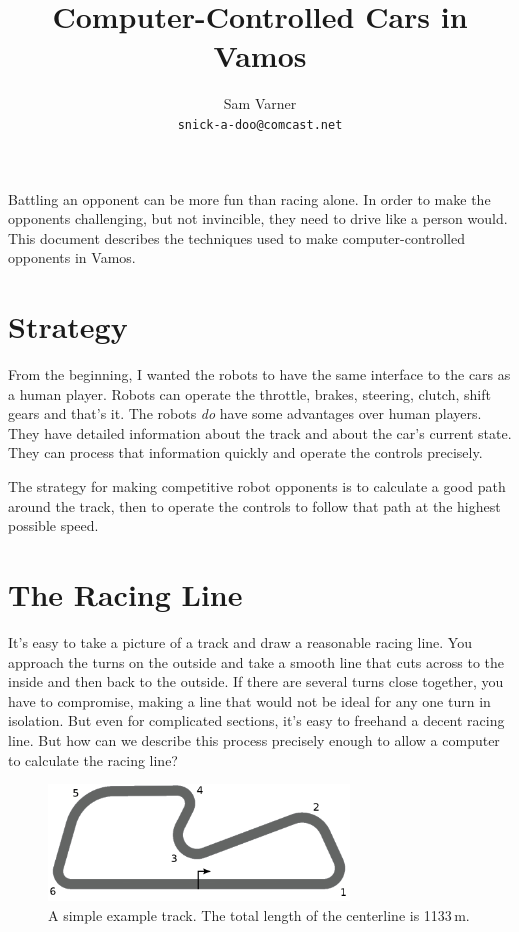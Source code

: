 \documentclass{article}
\begin{document}
\newcommand{\vmax}{\ensuremath{v_\mathrm{max}}}
\newcommand{\vecsub}[2]{\ensuremath{\mathbf{#1}_{\mathrm{#2}}}}
\newcommand{\rsub}[1]{\vecsub{r}{#1}}
\newcommand{\vunit}[1]{\ensuremath{\hat{\mathbf{#1}}}}
\newcommand{\runit}[1]{\ensuremath{\vunit{r}_{#1}}}

\title{Computer-Controlled Cars in Vamos}
\author{Sam Varner\\ \texttt{snick-a-doo@comcast.net}}
\maketitle

Battling an opponent can be more fun than racing alone.  In order to make the
opponents challenging, but not invincible, they need to drive like a person
would.  This document describes the techniques used to make computer-controlled
opponents in Vamos.

\section{Strategy}
From the beginning, I wanted the robots to have the same interface to the cars
as a human player.  Robots can operate the throttle, brakes, steering, clutch,
shift gears and that's it.  The robots {\em do} have some advantages over human
players.  They have detailed information about the track and about the car's
current state.  They can process that information quickly and operate the
controls precisely.

The strategy for making competitive robot opponents is to calculate a good path
around the track, then to operate the controls to follow that path at the
highest possible speed.

\section{The Racing Line}
\label{sec:the-racing-line}
It's easy to take a picture of a track and draw a reasonable racing line.  You
approach the turns on the outside and take a smooth line that cuts across to the
inside and then back to the outside.  If there are several turns close together,
you have to compromise, making a line that would not be ideal for any one turn
in isolation.  But even for complicated sections, it's easy to freehand a decent
racing line.  But how can we describe this process precisely enough to allow a
computer to calculate the racing line?

\begin{figure}
  \centering
  \includegraphics[width=8cm]{track.png}  
  \caption{A simple example track.  The total length of the centerline is 1133\,m.}
  \label{fig:track}
\end{figure}
\end{document}
